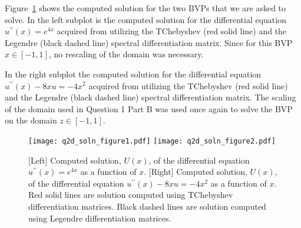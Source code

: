 \documentclass[12pt]{article}
\begin{document}
Figure~\ref{fig:q2d_figure} shows the computed solution for the two BVPs that we are asked to solve. In the left subplot is the computed solution for the differential equation $u^{\prime\prime}(x) = e^{4x}$ acquired from utilizing the TChebyshev (red solid line) and the Legendre (black dashed line) spectral differentiation matrix. Since for this BVP $x\in [-1,1]$, no rescaling of the domain was necessary. 

In the right subplot the computed solution for the differential equation $u^{\prime\prime}(x) - 8xu = -4x^{2}$ acquired from utilizing the TChebyshev (red solid line) and the Legendre (black dashed line) spectral differentiation matrix. The scaling of the domain used in Question 1 Part B was used once again to solve the BVP on the domain $z\in [-1,1]$. 

\begin{figure}[!h]
	\centering
	\texttt{[image: q2d\_soln\_figure1.pdf]}
	\texttt{[image: q2d\_soln\_figure2.pdf]}
	\caption{[Left] Computed solution, $U(x)$, of the differential equation $u^{\prime\prime}(x) = e^{4x}$ as a function of $x$. [Right] Computed solution, $U(x)$, of the differential equation $u^{\prime\prime}(x) - 8xu = -4x^{2}$ as a function of $x$. Red solid lines are solution computed using TChebyshev differentiation matrices. Black dashed lines are solution computed using Legendre differentiation matrices.}
    \label{fig:q2d_figure}
\end{figure}
\end{document}
